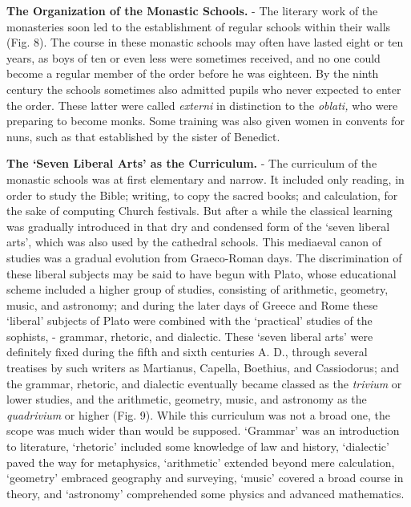 \documentclass[]{book}
\begin{document}
\textbf{The Organization of the Monastic Schools.} - The literary work of the monasteries soon led to the establishment of regular schools within their walls (Fig. 8). The course in these monastic schools may often have lasted eight or ten years, as boys of ten or even less were sometimes received, and no one could become a regular member of the order before he was eighteen. By the ninth century the schools sometimes also admitted pupils who never expected to enter the order. These latter were called \emph{externi} in distinction to the \emph{oblati,} who were preparing to become monks. Some training was also given women in convents for nuns, such as that established by the sister of Benedict.

\textbf{The `Seven Liberal Arts' as the Curriculum.} - The curriculum of the monastic schools was at first elementary and narrow. It included only reading, in order to study the Bible; writing, to copy the sacred books; and calculation, for the sake of computing Church festivals. But after a while the classical learning was gradually introduced in that dry and condensed form of the `seven liberal arts', which was also used by the cathedral schools. This mediaeval canon of studies was a gradual evolution from Graeco-Roman days. The discrimination of these liberal subjects may be said to have begun with Plato, whose educational scheme included a higher group of studies, consisting of arithmetic, geometry, music, and astronomy; and during the later days of Greece and Rome these `liberal' subjects of Plato were combined with the `practical' studies of the sophists, - grammar, rhetoric, and dialectic. These `seven liberal arts' were definitely fixed during the fifth and sixth centuries A. D., through several treatises by such writers as Martianus, Capella, Boethius, and Cassiodorus; and the grammar, rhetoric, and dialectic eventually became classed as the \emph{trivium} or lower studies, and the arithmetic, geometry, music, and astronomy as the \emph{quadrivium} or higher (Fig. 9). While this curriculum was not a broad one, the scope was much wider than would be supposed. `Grammar' was an introduction to literature, `rhetoric' included some knowledge of law and history, `dialectic' paved the way for metaphysics, `arithmetic' extended beyond mere calculation, `geometry' embraced geography and surveying, `music' covered a broad course in theory, and `astronomy' comprehended some physics and advanced mathematics.
\end{document}
